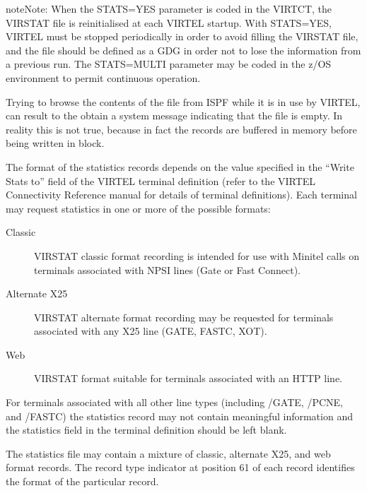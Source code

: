 \documentclass[letterpaper,10pt,english]{sphinxmanual}
\begin{document}
\begin{sphinxadmonition}{note}{Note:}
When the STATS=YES parameter is coded in the VIRTCT, the VIRSTAT file is reinitialised at each VIRTEL startup. With STATS=YES, VIRTEL must be stopped periodically in order to avoid filling the VIRSTAT
file, and the file should be defined as a GDG in order not to lose the information from a previous run. The STATS=MULTI parameter may be coded in the z/OS environment to permit continuous operation.

Trying to browse the contents of the file from ISPF while it is in use by VIRTEL, can result to the obtain a system message indicating that the file is empty. In reality this is not true, because in fact
the records are buffered in memory before being written in block.
\end{sphinxadmonition}

The format of the statistics records depends on the value specified in the “Write Stats to” field of the VIRTEL terminal definition (refer to the VIRTEL Connectivity Reference manual for details of terminal definitions). Each terminal may request statistics in one or more of the possible formats:
\begin{description}
\item[{Classic}] \leavevmode
VIRSTAT classic format recording is intended for use with Minitel calls on terminals associated with NPSI lines (Gate or Fast Connect).

\item[{Alternate X25}] \leavevmode
VIRSTAT alternate format recording may be requested for terminals associated with any X25 line (GATE, FASTC, XOT).

\item[{Web}] \leavevmode
VIRSTAT format suitable for terminals associated with an HTTP line.

\end{description}

For terminals associated with all other line types (including /GATE, /PCNE, and /FASTC) the statistics record may not contain meaningful information and the statistics field in the terminal definition     should be left blank.

The statistics file may contain a mixture of classic, alternate X25, and web format records. The record type indicator at position 61 of each record identifies the format of the particular record.

\newpage

\end{document}
